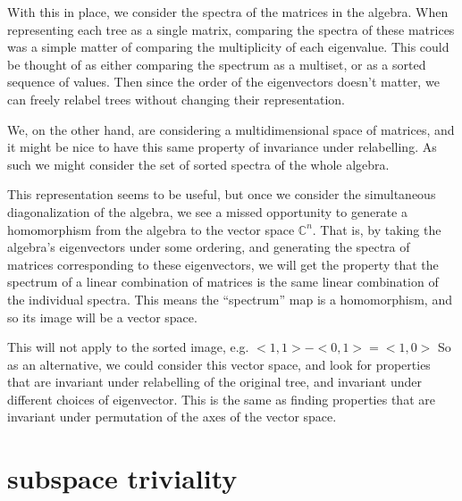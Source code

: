 \documentclass{report}
\begin{document}
With this in place, we consider the spectra of the matrices in the algebra.
When representing each tree as a single matrix, comparing the spectra of these
matrices was a simple matter of comparing the multiplicity of each eigenvalue.
This could be thought of as either comparing the spectrum as a multiset, or as
a sorted sequence of values.
Then since the order of the eigenvectors doesn't matter, we can freely relabel
trees without changing their representation.

We, on the other hand, are considering a multidimensional space of matrices,
and it might be nice to have this same property of invariance under
relabelling.
As such we might consider the set of sorted spectra of the whole algebra.

This representation seems to be useful, but once we consider the simultaneous
diagonalization of the algebra, we see a missed opportunity to generate a
homomorphism from the algebra to the vector space $\mathds{C}^n$.
That is, by taking the algebra's eigenvectors under some ordering, and
generating the spectra of matrices corresponding to these eigenvectors, we will
get the property that the spectrum of a linear combination of matrices is the
same linear combination of the individual spectra.
This means the ``spectrum'' map is a homomorphism, and so its image will be a
vector space.

This will not apply to the sorted image, e.g. $<1, 1> - <0, 1> = <1, 0>$
So as an alternative, we could consider this vector space, and look for
properties that are invariant under relabelling of the original tree, and
invariant under different choices of eigenvector.
This is the same as finding properties that are invariant under permutation of
the axes of the vector space.


\section{subspace triviality}
\end{document}
